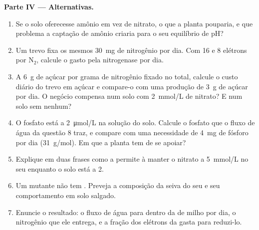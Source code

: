 \begin{problem}
\medskip
\noindent\textbf{Parte IV --- Alternativas.}
\begin{enumerate}[resume]
  \item Se o solo oferecesse amônio em vez de nitrato, o que a planta
        pouparia, e que problema a captação de amônio criaria para o
        seu equilíbrio de pH?
  \item Um trevo fixa os mesmos \qty{30}{mg} de nitrogênio por dia.
        Com \qty{16}{}  e \qty{8}{} elétrons por $\mathrm{N_2}$,
        calcule o  gasto pela nitrogenase por dia.
  \item A \qty{6}{g} de açúcar por grama de nitrogênio fixado no
        total, calcule o custo diário do trevo em açúcar e compare-o
        com uma produção de \qty{3}{g} de açúcar por dia. O negócio
        compensa num solo com \qty{2}{mmol/L} de nitrato? E num solo
        sem nenhum?
  \item O fosfato está a \qty{2}{\micro mol/L} na solução do solo.
        Calcule o fosfato que o fluxo de água da questão 8 traz, e
        compare com uma necessidade de \qty{4}{mg} de fósforo por dia
        (\qty{31}{g/mol}). Em que a planta tem de se apoiar?
  \item Explique em duas frases como a  permite à
         manter o nitrato a \qty{5}{mmol/L} no seu  enquanto
        o solo está a \qty{2}{}.
  \item Um mutante não tem . Preveja a composição da
        seiva do seu  e seu comportamento em solo salgado.
  \item Enuncie o resultado: o fluxo de água para dentro da  de
        milho por dia, o nitrogênio que ele entrega, e a fração dos
        elétrons da  gasta para reduzi-lo.
\end{enumerate}
\end{problem}
